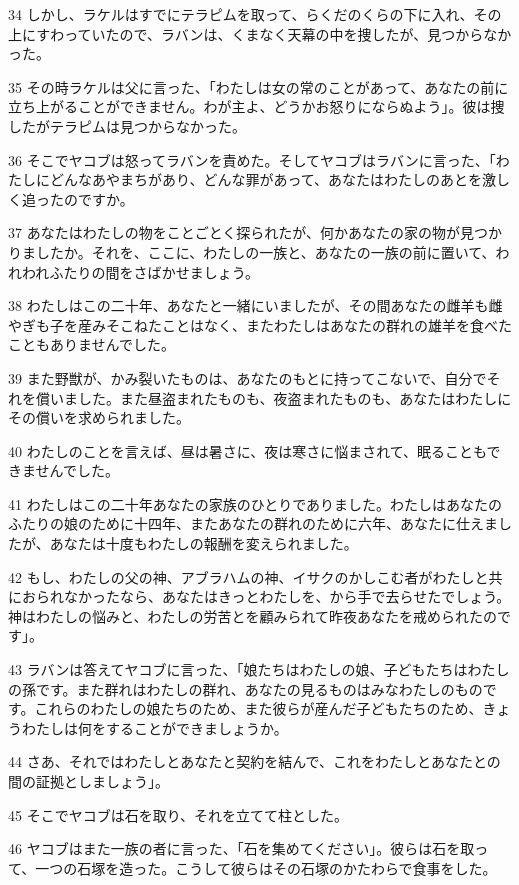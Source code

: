 \par 34 しかし、ラケルはすでにテラピムを取って、らくだのくらの下に入れ、その上にすわっていたので、ラバンは、くまなく天幕の中を捜したが、見つからなかった。
\par 35 その時ラケルは父に言った、「わたしは女の常のことがあって、あなたの前に立ち上がることができません。わが主よ、どうかお怒りにならぬよう」。彼は捜したがテラピムは見つからなかった。
\par 36 そこでヤコブは怒ってラバンを責めた。そしてヤコブはラバンに言った、「わたしにどんなあやまちがあり、どんな罪があって、あなたはわたしのあとを激しく追ったのですか。
\par 37 あなたはわたしの物をことごとく探られたが、何かあなたの家の物が見つかりましたか。それを、ここに、わたしの一族と、あなたの一族の前に置いて、われわれふたりの間をさばかせましょう。
\par 38 わたしはこの二十年、あなたと一緒にいましたが、その間あなたの雌羊も雌やぎも子を産みそこねたことはなく、またわたしはあなたの群れの雄羊を食べたこともありませんでした。
\par 39 また野獣が、かみ裂いたものは、あなたのもとに持ってこないで、自分でそれを償いました。また昼盗まれたものも、夜盗まれたものも、あなたはわたしにその償いを求められました。
\par 40 わたしのことを言えば、昼は暑さに、夜は寒さに悩まされて、眠ることもできませんでした。
\par 41 わたしはこの二十年あなたの家族のひとりでありました。わたしはあなたのふたりの娘のために十四年、またあなたの群れのために六年、あなたに仕えましたが、あなたは十度もわたしの報酬を変えられました。
\par 42 もし、わたしの父の神、アブラハムの神、イサクのかしこむ者がわたしと共におられなかったなら、あなたはきっとわたしを、から手で去らせたでしょう。神はわたしの悩みと、わたしの労苦とを顧みられて昨夜あなたを戒められたのです」。
\par 43 ラバンは答えてヤコブに言った、「娘たちはわたしの娘、子どもたちはわたしの孫です。また群れはわたしの群れ、あなたの見るものはみなわたしのものです。これらのわたしの娘たちのため、また彼らが産んだ子どもたちのため、きょうわたしは何をすることができましょうか。
\par 44 さあ、それではわたしとあなたと契約を結んで、これをわたしとあなたとの間の証拠としましょう」。
\par 45 そこでヤコブは石を取り、それを立てて柱とした。
\par 46 ヤコブはまた一族の者に言った、「石を集めてください」。彼らは石を取って、一つの石塚を造った。こうして彼らはその石塚のかたわらで食事をした。
